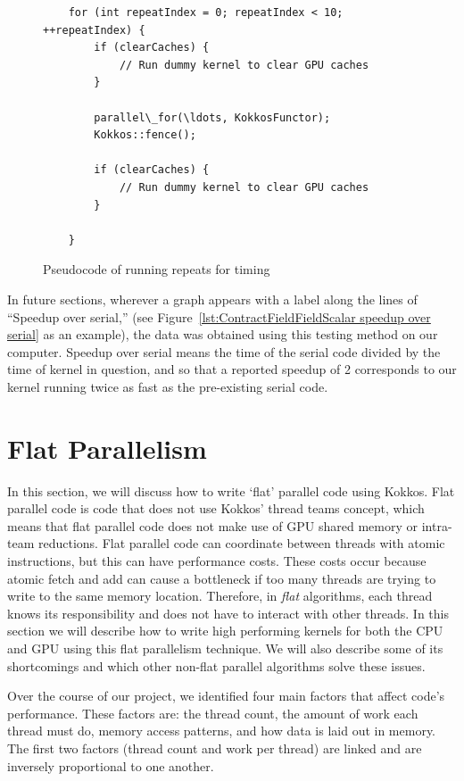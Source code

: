 \begin{figure}[ht]
\begin{lstlisting}
    for (int repeatIndex = 0; repeatIndex < 10; ++repeatIndex) {
        if (clearCaches) {
            // Run dummy kernel to clear GPU caches
        }

        parallel\_for(\ldots, KokkosFunctor);
        Kokkos::fence();

        if (clearCaches) {
            // Run dummy kernel to clear GPU caches
        }

    }

 \end{lstlisting}
\caption{Pseudocode of running repeats for timing}
\label{lst:repeats}
\end{figure}

In future sections, wherever a graph appears with a label along the lines of
``Speedup over serial,'' (see Figure~\ref{lst:ContractFieldFieldScalar speedup
over serial} as an example), the data was obtained using this testing method on
our computer. Speedup over serial means the time of the serial code divided by
the time of kernel in question, and so that a reported speedup of 2 corresponds
to our kernel running twice as fast as the pre-existing serial code.


\section{Flat Parallelism}
In this section, we will discuss how to write `flat' parallel code using Kokkos.
Flat parallel code is code that does not use Kokkos' thread teams concept, which
means that flat parallel code does not make use of GPU shared memory or
intra-team reductions.  Flat parallel code can coordinate between threads with atomic
instructions, but this can have performance costs. These costs occur because
atomic fetch and add can cause a bottleneck if too many threads are trying to
write to the same memory location. Therefore, in \emph{flat} algorithms, each
thread knows its responsibility and does not have to interact with other
threads. In this section we will describe how to write high performing kernels
for both the CPU and GPU using this flat parallelism technique. We will also
describe some of its shortcomings and which other non-flat parallel algorithms
solve these issues.

Over the course of our project, we identified four main factors that affect
code's performance. These factors are: the thread count, the amount of work each
thread must do, memory access patterns, and how data is laid out in memory.  The
first two factors (thread count and work per thread) are linked and are
inversely proportional to one another. 

